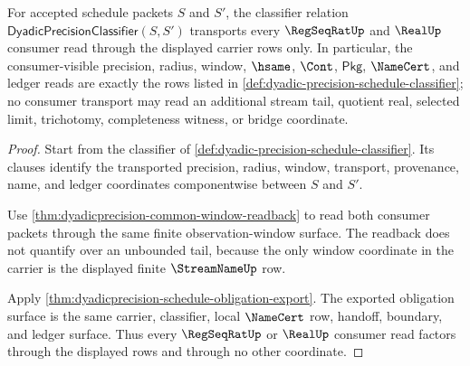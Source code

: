 \begin{theorem}
\label{thm:dyadicprecision-classifier-consumer-transport}
For accepted schedule packets $S$ and $S'$, the classifier relation
$\mathsf{DyadicPrecisionClassifier}(S,S')$ transports every $\RegSeqRatUp$ and
$\RealUp$ consumer read through the displayed carrier rows only. In particular,
the consumer-visible precision, radius, window, $\hsame$, $\Cont$, $\mathsf{Pkg}$,
$\NameCert$, and ledger reads are exactly the rows listed in
\autoref{def:dyadic-precision-schedule-classifier}; no consumer transport may
read an additional stream tail, quotient real, selected limit, trichotomy,
completeness witness, or bridge coordinate.
\end{theorem}
\begin{proof}
Start from the classifier of
\autoref{def:dyadic-precision-schedule-classifier}. Its clauses identify the
transported precision, radius, window, transport, provenance, name, and ledger
coordinates componentwise between $S$ and $S'$.

Use \autoref{thm:dyadicprecision-common-window-readback} to read both consumer
packets through the same finite observation-window surface. The readback does
not quantify over an unbounded tail, because the only window coordinate in the
carrier is the displayed finite $\StreamNameUp$ row.

Apply \autoref{thm:dyadicprecision-schedule-obligation-export}. The exported
obligation surface is the same carrier, classifier, local $\NameCert$ row,
handoff, boundary, and ledger surface. Thus every $\RegSeqRatUp$ or $\RealUp$
consumer read factors through the displayed rows and through no other
coordinate.
\end{proof}

